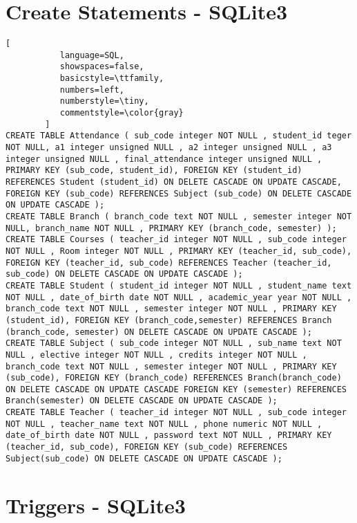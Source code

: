 \section{Create Statements - SQLite3}
\begin{lstlisting}[
           language=SQL,
           showspaces=false,
           basicstyle=\ttfamily,
           numbers=left,
           numberstyle=\tiny,
           commentstyle=\color{gray}
        ]
CREATE TABLE Attendance ( sub_code integer NOT NULL , student_id teger NOT NULL, a1 integer unsigned NULL , a2 integer unsigned NULL , a3 integer unsigned NULL , final_attendance integer unsigned NULL , PRIMARY KEY (sub_code, student_id), FOREIGN KEY (student_id) REFERENCES Student (student_id) ON DELETE CASCADE ON UPDATE CASCADE, FOREIGN KEY (sub_code) REFERENCES Subject (sub_code) ON DELETE CASCADE ON UPDATE CASCADE );
CREATE TABLE Branch ( branch_code text NOT NULL , semester integer NOT NULL, branch_name NOT NULL , PRIMARY KEY (branch_code, semester) );
CREATE TABLE Courses ( teacher_id integer NOT NULL , sub_code integer NOT NULL , Room integer NOT NULL , PRIMARY KEY (teacher_id, sub_code), FOREIGN KEY (teacher_id, sub_code) REFERENCES Teacher (teacher_id, sub_code) ON DELETE CASCADE ON UPDATE CASCADE );
CREATE TABLE Student ( student_id integer NOT NULL , student_name text NOT NULL , date_of_birth date NOT NULL , academic_year year NOT NULL , branch_code text NOT NULL , semester integer NOT NULL , PRIMARY KEY (student_id), FOREIGN KEY (branch_code,semester) REFERENCES Branch (branch_code, semester) ON DELETE CASCADE ON UPDATE CASCADE );
CREATE TABLE Subject ( sub_code integer NOT NULL , sub_name text NOT NULL , elective integer NOT NULL , credits integer NOT NULL , branch_code text NOT NULL , semester integer NOT NULL , PRIMARY KEY (sub_code), FOREIGN KEY (branch_code) REFERENCES Branch(branch_code) ON DELETE CASCADE ON UPDATE CASCADE FOREIGN KEY (semester) REFERENCES Branch(semester) ON DELETE CASCADE ON UPDATE CASCADE );
CREATE TABLE Teacher ( teacher_id integer NOT NULL , sub_code integer NOT NULL , teacher_name text NOT NULL , phone numeric NOT NULL , date_of_birth date NOT NULL , password text NOT NULL , PRIMARY KEY (teacher_id, sub_code), FOREIGN KEY (sub_code) REFERENCES Subject(sub_code) ON DELETE CASCADE ON UPDATE CASCADE );
\end{lstlisting}
\pagebreak

\section{Triggers - SQLite3}

